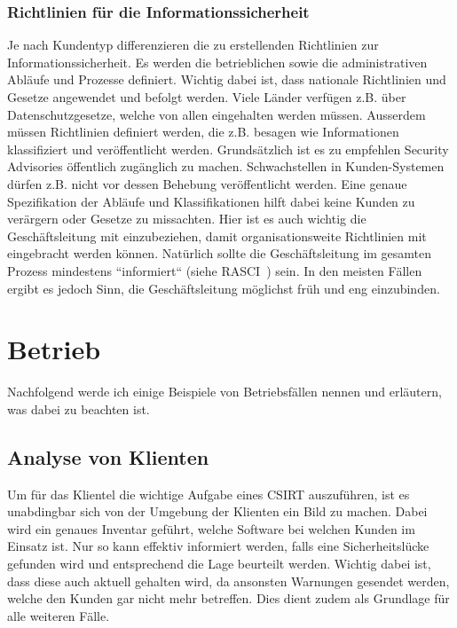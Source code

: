 \subsubsection{Richtlinien für die Informationssicherheit}
Je nach Kundentyp differenzieren die zu erstellenden Richtlinien zur Informationssicherheit. Es werden die betrieblichen sowie die administrativen Abläufe und Prozesse definiert. Wichtig dabei ist, dass nationale Richtlinien und Gesetze angewendet und befolgt werden. Viele Länder verfügen z.B. über Datenschutzgesetze, welche von allen eingehalten werden müssen. Ausserdem müssen Richtlinien definiert werden, die z.B. besagen wie Informationen klassifiziert und veröffentlicht werden. Grundsätzlich ist es zu empfehlen Security Advisories öffentlich zugänglich zu machen. Schwachstellen in Kunden-Systemen dürfen z.B. nicht vor dessen Behebung veröffentlicht werden. Eine genaue Spezifikation der Abläufe und Klassifikationen hilft dabei keine Kunden zu verärgern oder Gesetze zu missachten. Hier ist es auch wichtig die Geschäftsleitung mit einzubeziehen, damit organisationsweite Richtlinien mit eingebracht werden können. Natürlich sollte die Geschäftsleitung im gesamten Prozess mindestens ``informiert`` (siehe RASCI~\citep{rasci}) sein. In den meisten Fällen ergibt es jedoch Sinn, die Geschäftsleitung möglichst früh und eng einzubinden.

\section{Betrieb}
Nachfolgend werde ich einige Beispiele von Betriebsfällen nennen und erläutern, was dabei zu beachten ist.

\subsection{Analyse von Klienten}
Um für das Klientel die wichtige Aufgabe eines CSIRT auszuführen, ist es unabdingbar sich von der Umgebung der Klienten ein Bild zu machen. Dabei wird ein genaues Inventar geführt, welche Software bei welchen Kunden im Einsatz ist. Nur so kann effektiv informiert werden, falls eine Sicherheitslücke gefunden wird und entsprechend die Lage beurteilt werden. Wichtig dabei ist, dass diese auch aktuell gehalten wird, da ansonsten Warnungen gesendet werden, welche den Kunden gar nicht mehr betreffen. Dies dient zudem als Grundlage für alle weiteren Fälle.

